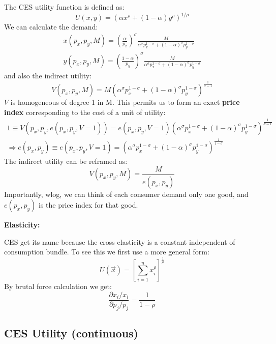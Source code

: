 \documentclass{book}
\theoremstyle{plain}
\theoremstyle{definition}
\newcommand{\mysubtitle}[1]{{\normalsize{\textbf{#1}}}}
\begin{document}
The CES utility function is defined as:
\[U ( x , y ) = \left( \alpha x ^ { \rho } + ( 1 - \alpha ) y ^ { \rho } \right) ^ { 1 / \rho }\]
We can calculate the demand:
\[\begin{array} { c } { x \left( p _ { x } , p _ { y } , M \right) = \left( \frac { \alpha } { p _ { x } } \right) ^ { \sigma } \frac { M } { \alpha ^ { \sigma } p _ { x } ^ { 1 - \sigma } + ( 1 - \alpha ) ^ { \sigma } p _ { y } ^ { 1 - \sigma } } } \\ { y \left( p _ { x } , p _ { y } , M \right) = \left( \frac { 1 - \alpha } { p _ { y } } \right) ^ { \sigma } \frac { M } { \alpha ^ { \sigma } p _ { x } ^ { 1 - \sigma } + ( 1 - \alpha ) ^ { \sigma } p _ { y } ^ { 1 - \sigma } } } \end{array}\]
and also the indirect utility:
\[V \left( p _ { x } , p _ { y } , M \right) = M \left( \alpha ^ { \sigma } p _ { x } ^ { 1 - \sigma } + ( 1 - \alpha ) ^ { \sigma } p _ { y } ^ { 1 - \sigma } \right) ^ { \frac { 1 } { \sigma - 1 } }\]
$V$ is homogeneous of degree 1 in M. This permits us to form an exact \textbf{price index} corresponding to the cost of a unit of utility:
\begin{align*}
	1 \equiv V(p_x,p_y,e(p_x,p_y,V=1)) = e(p_x,p_y,V=1)\left( \alpha ^ { \sigma } p _ { x } ^ { 1 - \sigma } + ( 1 - \alpha ) ^ { \sigma } p _ { y } ^ { 1 - \sigma } \right) ^ { \frac { 1 } { \sigma - 1 } } \\
	\Rightarrow e(p_x,p_y) \equiv e(p_x,p_y,V=1) = 
	\left( \alpha ^ { \sigma } p _ { x } ^ { 1 - \sigma } + ( 1 - \alpha ) ^ { \sigma } p _ { y } ^ { 1 - \sigma } \right) ^ { \frac { 1 } {1- \sigma } }
\end{align*}
The indirect utility can be reframed as:
\[V(p_x,p_y,M) = \frac{M}{e(p_x,p_y)}\]
Importantly, wlog, we can think of each consumer demand only one good, and $e(p_x,p_y)$ is the price index for that good.


\mysubtitle{Elasticity:}

CES get its name because the cross elasticity is a constant independent of consumption bundle. To see this we first use a more general form:
\[U(\vec x) = \left[ \sum_{i=1}^n x_i^\rho \right]^{\frac{1}{\rho}}\]
By brutal force calculation we get:
\[\frac{\partial x_i/ x_i}{\partial p_j / p_j} = \frac{1}{1-\rho}\]

\subsection{CES Utility (continuous)} %
\label{sub:ces_utility_}
\end{document}

